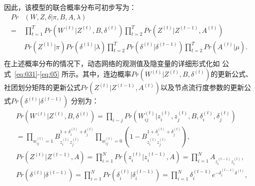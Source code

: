 因此，该模型的联合概率分布可初步写为：
\begin{equation}
\begin{split}
Pr&(W,Z,\delta|\pi,B,A,\lambda) \\
=    &   \prod_{t=1}^{T} Pr(W^{(t)}|Z^{(t)},B,\delta^{(t)}) \prod_{t=2}^{T} Pr(Z^{(t)}|Z^{(t-1)},A^{(t)})   \\
& Pr(Z^{(1)}|\pi) Pr(\delta^{(1)}|\lambda) \prod_{t=2}^{T} Pr(\delta^{(t)}|\delta^{(t-1)}) \prod_{t=2}^{T} Pr(A^{(t)} | \mu).\\
\label{eq:03}
\end{split}
\end{equation}
在上述概率分布的情况下，动态网络的观测值及隐变量的详细形式化如 公式~\ref{eq:031}-\ref{eq:05} 所示。其中，连边概率$Pr(W^{(t)}|Z^{(t)},B,\delta^{(t)})$的更新公式、社团划分矩阵的更新公式$Pr(Z^{(t)}|Z^{(t-1)},A^{(t)})$以及节点流行度参数的更新公式$Pr(\delta^{(t)}|\delta^{(t-1)})$ 分别为：
\begin{align}
   &Pr  (W^{(t)}|Z^{(t)},B,\delta^{(t)}) = \prod_{i \sim j} Pr(W^{(t)}_{ij}|z^{(t)}_i ,z^{(t)}_j, B, \delta^{(t)}_i, \delta^{(t)}_j )   \nonumber  \\
& = \prod_{w_{ij}^{(t)}=1} B_{z_i^{(t)} z_j^{(t)}}^{1+\delta_i^{(t)}+\delta_j^{(t)}}  \prod_{w_{ij}^{(t)}=0} (1-B_{z_i^{(t)} z_j^{(t)}}^{1+\delta_i^{(t)}+\delta_j^{(t)}}),     
\label{eq:031}\\
&Pr(Z^{(t)}|Z^{(t-1)},A) = \prod_{i=1}^{N} Pr(z_i^{(t)} | z_i^{(t-1)},A )= \prod_{i=1}^{N} A_{z_i^{(t-1)} z_i^{(t)}},  
\label{eq:04}\\
&Pr (\delta^{(t)}|\delta^{(t-1)})  = \prod_{i=1}^{N} Pr(\delta_i^{(t)}|\delta_i^{(t-1)}) = \prod_{i=1}^{N} \delta_i^{(t-1)} e^{-\delta_i^{(t-1)} \delta^{(t)}},
\label{eq:05}
\end{align}

